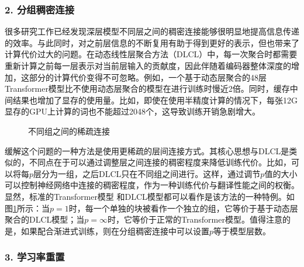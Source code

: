 
\subsubsection{2. 分组稠密连接}

\parinterval 很多研究工作已经发现深层模型不同层之间的稠密连接能够很明显地提高信息传递的效率。与此同时，对之前层信息的不断复用有助于得到更好的表示，但也带来了计算代价过大的问题。在动态线性层聚合方法（DLCL）中，每一次聚合时都需要重新计算之前每一层表示对当前层输入的贡献度，因此伴随着编码器整体深度的增加，这部分的计算代价变得不可忽略。例如，一个基于动态层聚合的48层Transformer模型比不使用动态层聚合的模型在进行训练时慢近2倍。同时，缓存中间结果也增加了显存的使用量。比如，即使在使用半精度计算的情况下，每张12G显存的GPU上计算的词也不能超过2048个，这导致训练开销急剧增大。

\begin{figure}[htp]
\centering

\caption{不同组之间的稀疏连接}
\label{fig:15-16}
\end{figure}

\parinterval 缓解这个问题的一种方法是使用更稀疏的层间连接方式。其核心思想与DLCL是类似的，不同点在于可以通过调整层之间连接的稠密程度来降低训练代价。比如，可以将每$p$层分为一组，之后DLCL只在不同组之间进行。这样，通过调节$p$值的大小可以控制神经网络中连接的稠密程度，作为一种训练代价与翻译性能之间的权衡。显然，标准的Transformer模型 和DLCL模型都可以看作是该方法的一种特例。如图\ref{fig:15-16}所示：当$p=1$时，每一个单独的块被看作一个独立的组，它等价于基于动态层聚合的DLCL模型；当$p=\infty$时，它等价于正常的Transformer模型。值得注意的是，如果配合渐进式训练，则在分组稠密连接中可以设置$p$等于模型层数。


\subsubsection{3. 学习率重置}

